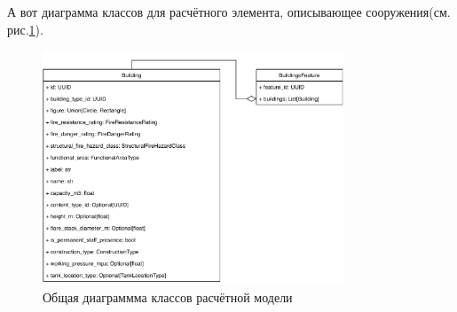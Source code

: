 А вот диаграмма классов для расчётного элемента, описывающее сооружения(см. рис.\ref{pic:implementation__model-feature}).
\begin{figure}[H]
	\includegraphics[width=0.8\textwidth]{implementation/pictures/model/feature}
	\caption{Общая диаграммма классов расчётной модели}
	\label{pic:implementation__model-feature}
\end{figure}

